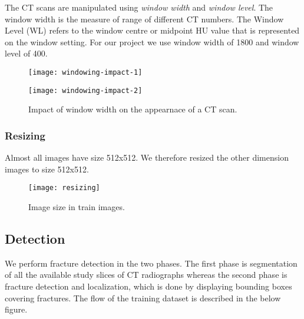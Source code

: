 \documentclass[pdflatex,sn-mathphys]{sn-jnl}%
\theoremstyle{thmstyleone}%
\theoremstyle{thmstyletwo}%
\theoremstyle{thmstylethree}%
\begin{document}
\vspace*{-5mm}
The CT scans are manipulated using \emph{window width} and \emph{window level}. The window width is the measure of range of different CT numbers. The Window Level (WL) refers to the window centre or midpoint HU value that is represented on the window setting. For our project we use window width of 1800 and window level of 400\cite{DBLP:journals/corr/abs-1812-00572}.

\vspace*{-5mm}
\begin{figure}[H]
\centering
\begin{minipage}[c]{0.5\textwidth}
    \centering
    \texttt{[image: windowing-impact-1]}
    
    \label{fig:mesh3.1}
\end{minipage}\hfill
\begin{minipage}[c]{0.5\textwidth}
    \centering
    \texttt{[image: windowing-impact-2]}
    \label{fig:mesh3.2}
\end{minipage}
\caption{\centering\footnotesize{Impact of window width on the appearnace of a CT scan. }}
\end{figure}
\vspace*{-10mm}

\subsubsection{Resizing}

Almost all images have size 512x512. We therefore resized the other dimension images to  size 512x512.

\vspace*{-5mm}
\begin{figure}[H]
 \begin{minipage}[c]{1\textwidth}
 \centering
    \texttt{[image: resizing]}
    \caption{\centering\footnotesize{ Image size in train images. }}
    \label{fig:mesh4}
\end{minipage}
\end{figure}

\subsection{Detection}\label{subsec1}

We perform fracture detection in the two phases. The first phase is segmentation of all the available study slices of CT radiographs whereas the second phase is fracture detection and localization, which is done by displaying bounding boxes covering fractures. The flow of the training dataset is described in the below figure.
\end{document}
